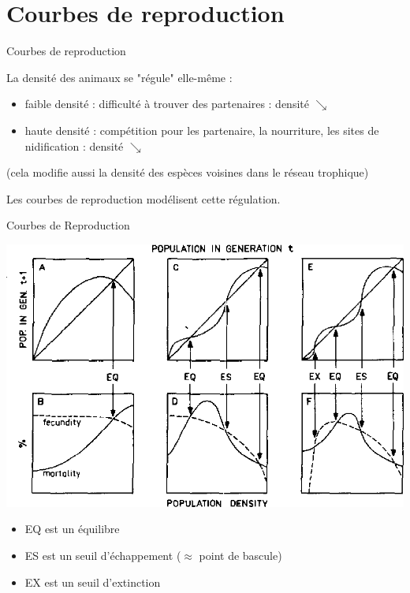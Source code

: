 \documentclass[11,aspectratio=1610]{beamer}
\begin{document}
\section{Courbes de reproduction }



\begin{frame}{Courbes de reproduction}
\begin{small}
La densité des animaux se "régule" elle-même : 

\begin{itemize}
  \item faible densité : difficulté à trouver des partenaires : densité $\searrow$
  \item haute  densité : compétition pour les partenaire, la nourriture, les sites de nidification  :  densité $\searrow$
\end{itemize}

(cela modifie aussi la densité des espèces voisines dans le réseau trophique)
\end{small}
\vfill 

Les courbes de reproduction modélisent cette régulation.


\end{frame}


\begin{frame}{Courbes de Reproduction}


\centering
\includegraphics[height=0.5\textheight]{img/reproduction_curves.png}
\begin{footnotesize}
\begin{itemize}
\item EQ est un  \alert{équilibre}
\item ES est un  \alert{seuil d'échappement} ($\approx$ point de bascule)
\item EX est un  \alert{seuil d'extinction }
\end{itemize}

  \end{footnotesize}

\end{frame}
\end{document}
